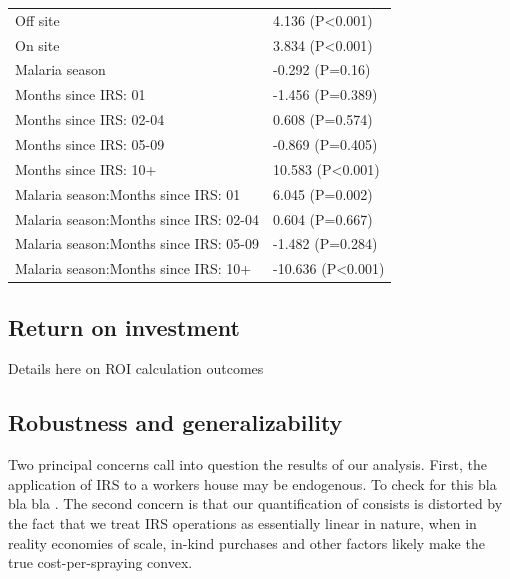\documentclass[]{article}
\begin{document}
\begin{table}
\begin{tabular}[t]{ll}
\hspace{1em}Off site & 4.136 (P<0.001)\\
\hspace{1em}On site & 3.834 (P<0.001)\\
\hspace{1em}Malaria season & -0.292 (P=0.16)\\
\hspace{1em}Months since IRS: 01 & -1.456 (P=0.389)\\
\hspace{1em}Months since IRS: 02-04 & 0.608 (P=0.574)\\
\hspace{1em}Months since IRS: 05-09 & -0.869 (P=0.405)\\
\hspace{1em}Months since IRS: 10+ & 10.583 (P<0.001)\\
\hspace{1em}Malaria season:Months since IRS: 01 & 6.045 (P=0.002)\\
\hspace{1em}Malaria season:Months since IRS: 02-04 & 0.604 (P=0.667)\\
\hspace{1em}Malaria season:Months since IRS: 05-09 & -1.482 (P=0.284)\\
\hspace{1em}Malaria season:Months since IRS: 10+ & -10.636 (P<0.001)\\
\bottomrule
\end{tabular}
\end{table}

\subsection{Return on investment}\label{return-on-investment}

Details here on ROI calculation outcomes

\subsection{Robustness and
generalizability}\label{robustness-and-generalizability}

Two principal concerns call into question the results of our analysis.
First, the application of IRS to a workers house may be endogenous. To
check for this bla bla bla
.
The second concern is that our quantification of consists is distorted
by the fact that we treat IRS operations as essentially linear in
nature, when in reality economies of scale, in-kind purchases and other
factors likely make the true cost-per-spraying
convex.
\end{document}
